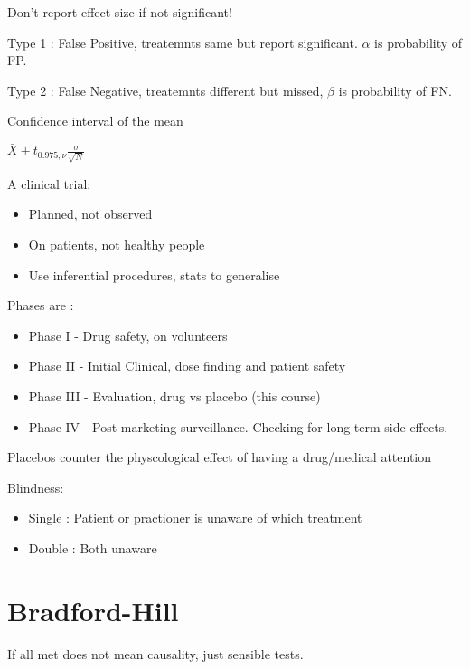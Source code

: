 \documentclass[
  letterpaper,
  DIV=11,
  numbers=noendperiod]{scrreprt}
\providecommand{\tightlist}{%
  \setlength{\itemsep}{0pt}\setlength{\parskip}{0pt}}\usepackage{longtable,booktabs,array}
\begin{document}
Don't report effect size if not significant!

Type 1 : False Positive, treatemnts same but report significant.
\(\alpha\) is probability of FP.

Type 2 : False Negative, treatemnts different but missed, \(\beta\) is
probability of FN.

Confidence interval of the mean

\(\bar{X} \pm t_{0.975, \nu} \frac{\sigma}{\sqrt{N}}\)

A clinical trial:

\begin{itemize}
\tightlist
\item
  Planned, not observed
\item
  On patients, not healthy people
\item
  Use inferential procedures, stats to generalise
\end{itemize}

Phases are :

\begin{itemize}
\tightlist
\item
  Phase I - Drug safety, on volunteers
\item
  Phase II - Initial Clinical, dose finding and patient safety
\item
  Phase III - Evaluation, drug vs placebo (this course)
\item
  Phase IV - Post marketing surveillance. Checking for long term side
  effects.
\end{itemize}

Placebos counter the physcological effect of having a drug/medical
attention

Blindness:

\begin{itemize}
\tightlist
\item
  Single : Patient or practioner is unaware of which treatment
\item
  Double : Both unaware
\end{itemize}

\hypertarget{bradford-hill}{%
\section{Bradford-Hill}\label{bradford-hill}}

If all met does not mean causality, just sensible tests.
\end{document}
